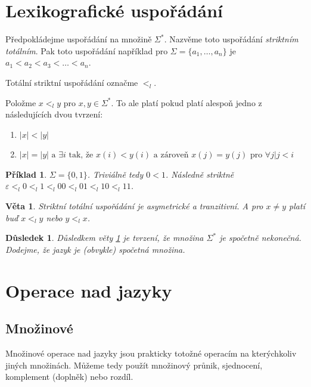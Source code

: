\documentclass[10pt, a4paper, titlepage]{article}
\theoremstyle{note}
\newtheorem{veta}{Věta}
\newtheorem{priklad}{Příklad}
\newtheorem{dusledek}{Důsledek}
\begin{document}
\section{Lexikografické uspořádání}
Předpokládejme uspořádání na množině $\Sigma^{*}$.
Nazvěme toto uspořádání \emph{striktním totálním}. Pak toto uspořádání například pro $\Sigma = \lbrace a_{1}, \ldots, a_{n} \rbrace$
je $a_{1} < a_{2} < a_{3} < \ldots < a_{n}$.

Totální striktní uspořádání označme $<_{l}$.

Položme $x <_{l} y$ pro $x,y \in \Sigma^{*}$. To ale platí pokud platí alespoň jedno z následujících dvou tvrzení:
\begin{enumerate}
\item
$|x| < |y|$

\item
$|x| = |y| \text{ a } \exists i \text{ tak, že } x(i) < y(i) \text{ a zároveň } x(j) = y(j) \text{ pro } \forall j |j < i$
\end{enumerate}

\begin{priklad}
$\Sigma = \lbrace 0, 1 \rbrace$. Triviálně tedy $0 < 1$.
Následně striktně $\varepsilon <_{l} 0 <_{l} 1 <_{l} 00 <_{l} 01 <_{l} 10 <_{l} 11$.
\end{priklad}

\begin{veta} \label{veta-1}
Striktní totální uspořádání je asymetrické a tranzitivní. A pro $x \neq y$ platí buď $x <_{l} y$ nebo $y <_{l} x$.
\end{veta}

\begin{dusledek}
Důsledkem věty \ref{veta-1} je tvrzení, že množina $\Sigma^{*}$ je spočetně nekonečná. Dodejme, že jazyk je (obvykle) spočetná množina.
\end{dusledek}

\section{Operace nad jazyky}

\subsection{Množinové}
Množinové operace nad jazyky jsou prakticky totožné operacím na kterýchkoliv jiných množinách. Můžeme tedy použít množinový průnik, sjednocení, komplement (doplněk) nebo rozdíl.
\end{document}

